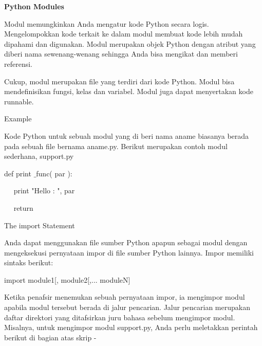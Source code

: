 
\sloppy
\begin{center}{\fontsize{16pt}{16pt}\selectfont \textbf{Python Modules} \\}\end{center} \par
\vspace{12pt}
\noindent 
Modul memungkinkan Anda mengatur kode Python secara logis. Mengelompokkan kode terkait ke dalam modul membuat kode lebih mudah dipahami dan digunakan. Modul merupakan objek Python dengan atribut yang diberi nama sewenang-wenang sehingga Anda bisa mengikat dan memberi referensi. \par
\noindent 
Cukup, modul merupakan file yang terdiri dari kode Python. Modul bisa mendefinisikan fungsi, kelas dan variabel. Modul juga dapat menyertakan kode runnable. \par
\vspace{12pt}
\noindent 
Example \par
\noindent 
Kode Python untuk sebuah modul yang di beri nama aname biasanya berada pada sebuah file bernama aname.py. Berikut merupakan contoh modul sederhana, support.py \par
\noindent 
 \hspace*{0.5in} def print $  \_  $func( par ): \par
\noindent 
 \hspace*{0.5in} ~~ print "Hello : ", par \par
\noindent 
 \hspace*{0.5in} ~~ return \par
\vspace{12pt}
\noindent 
The $  $import $  $Statement \par
\noindent 
Anda dapat menggunakan file sumber Python apapun sebagai modul dengan mengeksekusi pernyataan impor di file sumber Python lainnya. Impor memiliki sintaks berikut: \par
\noindent 
 \hspace*{0.5in} import module1[, module2[,... moduleN] \par
\noindent 
Ketika penafsir menemukan sebuah pernyataan impor, ia mengimpor modul apabila modul tersebut berada di jalur pencarian. Jalur pencarian merupakan daftar direktori yang ditafsirkan juru bahasa sebelum mengimpor modul. Misalnya, untuk mengimpor modul support.py, Anda perlu meletakkan perintah berikut di bagian atas skrip - \par
